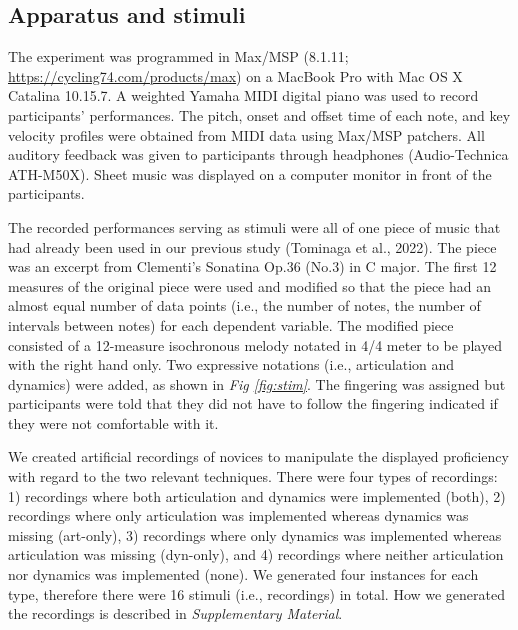 \documentclass[
  man,floatsintext]{apa6}
\begin{document}
\hypertarget{apparatus-and-stimuli}{%
\subsection{Apparatus and stimuli}\label{apparatus-and-stimuli}}

The experiment was programmed in Max/MSP (8.1.11; \url{https://cycling74.com/products/max}) on a MacBook Pro with Mac OS X Catalina 10.15.7. A weighted Yamaha MIDI digital piano was used to record participants' performances. The pitch, onset and offset time of each note, and key velocity profiles were obtained from MIDI data using Max/MSP patchers. All auditory feedback was given to participants through headphones (Audio-Technica ATH-M50X). Sheet music was displayed on a computer monitor in front of the participants.

The recorded performances serving as stimuli were all of one piece of music that had already been used in our previous study (Tominaga et al., 2022). The piece was an excerpt from Clementi's Sonatina Op.36 (No.3) in C major. The first 12 measures of the original piece were used and modified so that the piece had an almost equal number of data points (i.e., the number of notes, the number of intervals between notes) for each dependent variable. The modified piece consisted of a 12-measure isochronous melody notated in 4/4 meter to be played with the right hand only. Two expressive notations (i.e., articulation and dynamics) were added, as shown in \emph{Fig \ref{fig:stim}}. The fingering was assigned but participants were told that they did not have to follow the fingering indicated if they were not comfortable with it.

We created artificial recordings of novices to manipulate the displayed proficiency with regard to the two relevant techniques. There were four types of recordings: 1) recordings where both articulation and dynamics were implemented (both), 2) recordings where only articulation was implemented whereas dynamics was missing (art-only), 3) recordings where only dynamics was implemented whereas articulation was missing (dyn-only), and 4) recordings where neither articulation nor dynamics was implemented (none). We generated four instances for each type, therefore there were 16 stimuli (i.e., recordings) in total. How we generated the recordings is described in \emph{Supplementary Material}.
\end{document}
